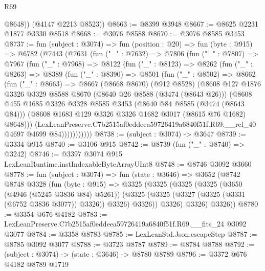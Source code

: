 \begin{lexlean}{R69}
\begin{coremodule}
          @8648))
      (@4147 @2213 @8523))
@8663 := @8399 @3948
@8667 := @8625 @2231 @1877 @3330 @8518
@8668 := @3076 @8588
@8670 := @3076 @8585 @3453
@8737 := fun (subject : @3074) =>
  fun (position : @20) =>
  fun (byte : @915) =>
  @6782
    (@7443
      (@7631
        (fun ("_" : @7632) =>
        @7806
          (fun ("_" : @7807) =>
          @7967
            (fun ("_" : @7968) =>
            @8122
              (fun ("_" : @8123) =>
              @8262
                (fun ("_" : @8263) =>
                @8389
                  (fun ("_" : @8390) =>
                  @8501
                    (fun ("_" : @8502) =>
                    @8662
                      (fun ("_" : @8663) =>
                      @8667
                        (@8668 @8670)
                        (@912 @8528)
                        (@8608
                          @127
                          @1876
                          @3326
                          @3329
                          @8588
                          @8670
                          (@8640 @26 @8588 (@3474 (@8643 @26)))
                          (@8608
                            @455
                            @1685
                            @3326
                            @3328
                            @8585
                            @3453
                            (@8640 @84 @8585 (@3474 (@8643 @84)))
                            (@8608 @1683 @129 @3326 @3326 @1682 @3017 (@8615 @76 @1682) @8648)))
                        (LexLeanPreserve.C7b2515af0eddeea59726419a6840f51f.R69.__rel_40
                          @4697
                          @4699
                          @84)))))))))))
@8738 := (subject : @3074) -> @3647
@8739 := @3334 @915
@8740 := @3106 @915
@8742 := @8739 (fun ("_" : @8740) => @3242)
@8746 := @3397 @3074 @915 LexLeanRuntime.instIndexableByteArrayUInt8
@8748 := @8746 @3092 @3660
@8778 := fun (subject : @3074) =>
  fun (state : @3646) =>
  @3652
    (@8742
      @8748
      @3328
      (fun (byte : @915) =>
      @3325
        (@3325
          (@3325
            (@3325
              (@3650 (@4946 (@5245 @3836 @84) @5261))
              (@3325 (@3325 (@3327 (@3325 (@3331 (@6752 @3836 @3077)) @3326)) @3326) @3326))
            @3326)
          @3326)
        @3326))
@8780 := @3354 @676 @4182
@8783 := LexLeanPreserve.C7b2515af0eddeea59726419a6840f51f.R69.__fits_24 @3092 @3077
@8784 := @3358 @8783
@8785 := LexLeanStd.Json.escapeStep
@8787 := @8785 @3092 @3077
@8788 := @3723 @8787
@8789 := @8784 @8788
@8792 := (subject : @3074) -> (state : @3646) -> @8780 @8789
@8796 := @3372 @676 @4182 @8789 @1719

\end{coremodule}
\end{lexlean}
